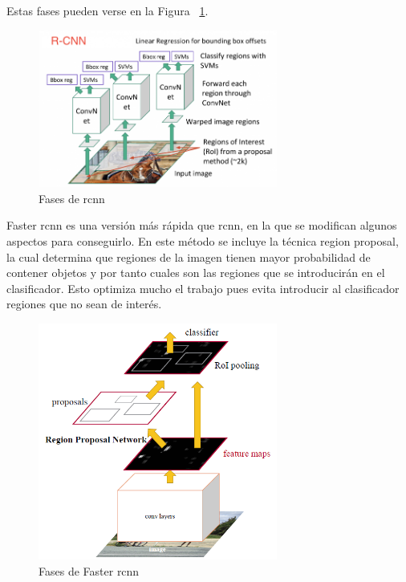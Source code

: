 Estas fases pueden verse en la Figura ~\ref{fig.rcnn}.

\begin{figure}[H]
  \begin{center}
    \includegraphics[width=0.7\textwidth]{figures/Estado_arte/rcnn.png}
		\caption{Fases de \acrshort{rcnn}}
		\label{fig.rcnn}
		\end{center}
\end{figure}

Faster \acrshort{rcnn} es una versión más rápida que \acrshort{rcnn}, en la que se modifican algunos aspectos para conseguirlo. En este método se incluye la técnica region proposal, la cual determina que regiones de la imagen tienen mayor probabilidad de contener objetos y por tanto cuales son las regiones que se introducirán en el clasificador. Esto optimiza mucho el trabajo pues evita introducir al clasificador regiones que no sean de interés.

\begin{figure}[H]
  \begin{center}
    \includegraphics[width=0.7\textwidth]{figures/Estado_arte/faster_rcnn.png}
		\caption{Fases de Faster \acrshort{rcnn}}
		\label{fig.fast_rcnn}
		\end{center}
\end{figure}

